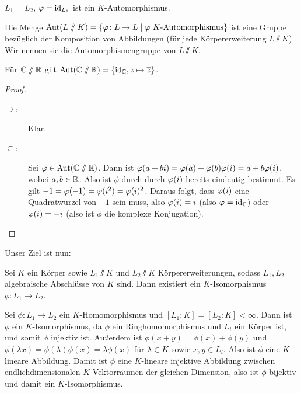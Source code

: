 \documentclass[12pt,a4paper]{scrartcl}
\begin{document}
\begin{bsp}
	$L_1 = L_2$, $\varphi = \operatorname{id}_{L_1}$ ist ein $K$-Automorphismus.
\end{bsp}

\begin{defi}
	Die Menge $\operatorname{Aut}(L\sslash K) = \{\varphi\colon L\to L\mid \varphi\ K\text{-Automorphismus}\}$ ist eine Gruppe bezüglich der Komposition von Abbildungen (für jede Körpererweiterung $L\sslash K$). Wir nennen sie die Automorphismengruppe von $L\sslash K$.
\end{defi}

\begin{bsp}
	Für $\mathbb C\sslash \mathbb R$ gilt $\operatorname{Aut}(\mathbb C\sslash\mathbb R) =\{\operatorname{id}_\mathbb C, z\mapsto \overline{z}\}$.
\end{bsp}
\begin{proof}
	\leavevmode
	\begin{description}
		\item[\glqq$\supseteq$\grqq:] Klar.
		\item[\glqq$\subseteq$\grqq:] Sei $\varphi\in \operatorname{Aut}(\mathbb C\sslash\mathbb R)$. Dann ist $\varphi(a+bi) =\varphi(a)+\varphi(b)\varphi(i) = a+b\varphi(i)$, wobei $a,b\in\mathbb R$. Also ist $\phi$ durch durch $\varphi(i)$ bereits eindeutig bestimmt. Es gilt $-1 = \varphi(-1) = \varphi(i^2) = \varphi(i)^2$. Daraus folgt, dass $\varphi(i)$ eine Quadratwurzel von $-1$ sein muss, also $\varphi(i)=i$ (also $\varphi = \operatorname{id}_\mathbb C$) oder $\varphi(i) = -i$ (also ist $\phi$ die komplexe Konjugation).
  \qedhere
	\end{description}
\end{proof}

\noindent
Unser Ziel ist nun:
\begin{satz}\label{thm:16.3}
	Sei $K$ ein Körper sowie $L_1\sslash K$ und $L_2\sslash K$ Körpererweiterungen, sodass $L_1,L_2$ algebraische Abschlüsse von $K$ sind. Dann existiert ein $K$-Isomorphismus $\phi\colon L_1\to L_2$.
\end{satz}

\begin{bem}
	Sei $\phi\colon L_1\to L_2$ ein $K$-Homomorphismus und $[L_1:K] = [L_2:K]<\infty$. Dann ist $\phi$ ein $K$-Isomorphismus, da $\phi$ ein Ringhomomorphismus und $L_i$ ein Körper ist, und somit $\phi$ injektiv ist. Außerdem ist $\phi(x+y) = \phi(x)+\phi(y)$ und $\phi(\lambda x) = \phi(\lambda)\phi(x) = \lambda\phi(x)$ für $\lambda\in K$ sowie $x,y\in L_i$. Also ist $\phi$ eine $K$-lineare Abbildung. Damit ist $\phi$ eine $K$-lineare injektive Abbildung zwischen endlichdimensionalen $K$-Vektorräumen der gleichen Dimension, also ist $\phi$ bijektiv und damit ein $K$-Isomorphismus.
\end{bem}
\end{document}
